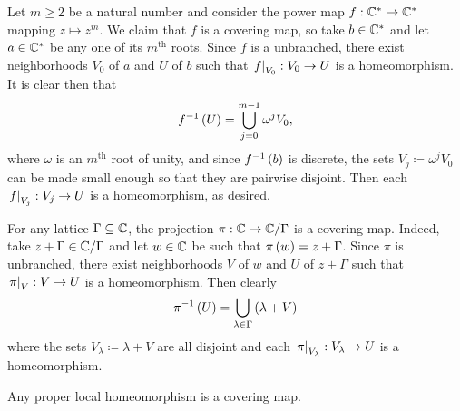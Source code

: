 \documentclass[../Moduli_Spaces_of_Riemann_Surfaces.tex]{subfiles}
\begin{document}
    \begin{example}
        Let $m\geq2$ be a natural number and consider the power map $f:\mathbb{C}^\ast\to\mathbb{C}^\ast$ mapping $z\mapsto z^m$. We claim that $f$ is a covering map, so take $b\in\mathbb{C}^\ast$ and let $a\in\mathbb{C}^\ast$ be any one of its $m^\textrm{th}$ roots. Since $f$ is a unbranched, there exist neighborhoods $V_0$ of $a$ and $U$ of $b$ such that $\left.f\right|_{V_0}:V_0\to U$ is a homeomorphism. It is clear then that
        \vspace{-0.05in}
        \begin{equation*}
            f^{-1}\left(U\right)=\bigcup_{j=0}^{m-1}\omega^jV_0,
        \end{equation*}
        where $\omega$ is an $m^\textrm{th}$ root of unity, and since $f^{-1}\left(b\right)$ is discrete, the sets $V_j\coloneqq\omega^jV_0$ can be made small enough so that they are pairwise disjoint. Then each $\left.f\right|_{V_j}:V_j\to U$ is a homeomorphism, as desired.\exqed
    \end{example}
    \begin{example}
        For any lattice $\Gamma\subseteq\mathbb{C}$, the projection $\pi:\mathbb{C}\to\mathbb{C}/\Gamma$ is a covering map. Indeed, take $z+\Gamma\in\mathbb{C}/\Gamma$ and let $w\in\mathbb{C}$ be such that $\pi\left(w\right)=z+\Gamma$. Since $\pi$ is unbranched, there exist neighborhoods $V$ of $w$ and $U$ of $z+\Gamma$ such that $\left.\pi\right|_{V}:V\to U$ is a homeomorphism. Then clearly
        \begin{equation*}
            \pi^{-1}\left(U\right)=\bigcup_{\lambda\in\Gamma}\left(\lambda+V\right)
        \end{equation*}
        where the sets $V_\lambda\coloneqq\lambda+V$ are all disjoint and each $\left.\pi\right|_{V_\lambda}:V_\lambda\to U$ is a homeomorphism.\exqed
    \end{example}
    \begin{proposition}\label{2.1:prp:proper_local_covering}
        Any proper local homeomorphism is a covering map.
    \end{proposition}
\end{document}
